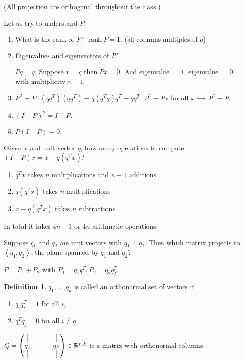 \documentclass{report}
\newcommand{\R}{\mathbb{R}}
\def \rank {\operatorname{rank}}
\newcommand{\inner}[2]{\left\langle #1, #2\right\rangle}
\theoremstyle{definition}
\newtheorem{definition}{Definition}[section]
\theoremstyle{remark}
\numberwithin{equation}{section}
\begin{document}
(All projection are orthogonal throughout the class.)

Let us try to understand $P$. \begin{enumerate}
    \item What is the rank of $P$? $\rank P = 1$. (all columns multiples of $q$)
    \item Eigenvalues and eigenvectors of $P$?
    
    $Pq = q$. Suppose $x \perp q$ then $Px = 0$. And eigenvalue $ = 1$, eigenvalue $ = 0$ with multiplicity $n-1$.
    \item $P^2 = P$. $(qq^T)(qq^T) = q(q^Tq)q^T = qq^T$. $P^2 = Px$ for all $x \implies P^2 = P$.
    \item $(I-P)^2 = I-P$.
    \item $P(I-P) = 0$.
\end{enumerate}

Given $x$ and unit vector $q$, how many operations to compute $(I - P)x = x - q(q^Tx)$?
\begin{enumerate}
    \item $q^Tx$ takes $n$ multiplications and $n-1$ additions
    \item $q(q^Tx)$ takes $n$ multiplications
    \item $x - q(q^Tx)$ takes $n$ subtractions
\end{enumerate}
In total it takes $4n - 1$ or $4n$ arithmetic operations.

Suppose $q_1$ and $q_2$ are unit vectors with $q_1 \perp q_2$. Then which matrix projects to $\inner{q_1}{q_2}$, the plane spanned by $q_1$ and $q_2$?

$P = P_1 + P_2$ with $P_1 = q_1q^T, P_2 = q_2q_2^T$. 

\begin{definition}
    $q_1, \ldots, q_k$ is called an orthonormal set of vectors if \begin{enumerate}
        \item $q_iq_i^T = 1$ for all $i$,
        \item $q_i^Tq_j = 0$ for all $i \neq q$.
    \end{enumerate}
    $Q = \begin{pmatrix}
        \vline & & \vline \\
        q_1 & \cdots & q_k \\
        \vline & & \vline
    \end{pmatrix} \in \R^{n, k}$ is a matrix with orthonormal columns.
\end{definition}
\end{document}
